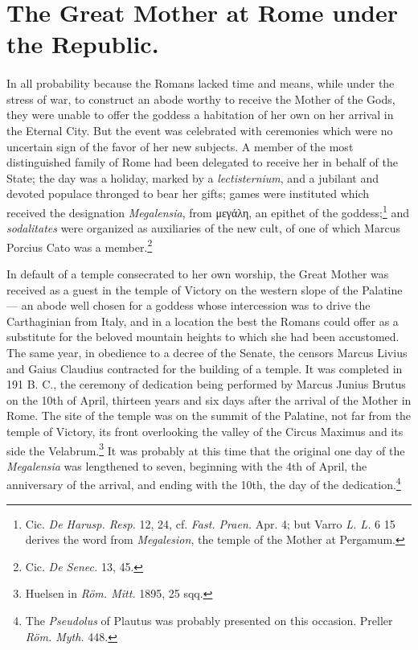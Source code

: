 \documentclass[a4paper, 11pt, oneside, polutonikogreek, english]{article}
\begin{document}
\section{The Great Mother at Rome under the Republic.}
\paragraph{}
In all probability because the Romans lacked time and means, while under the stress of war, to construct an abode worthy to receive the Mother of the Gods, they were unable to offer the goddess a habitation of her own on her arrival in the Eternal City. But the event was celebrated with ceremonies which were no uncertain sign of the favor of her new subjects. A member of the most distinguished family of Rome had been delegated to receive her in behalf of the State; the day was a holiday, marked by a \emph{lectisternium}, and a jubilant and devoted populace thronged to bear her gifts; games were instituted which received the designation \emph{Megalensia}, from μεγάλη, an epithet of the goddess;\footnote{Cic. \emph{De Harusp. Resp.} 12, 24, cf. \emph{Fast. Praen.} Apr. 4; but Varro \emph{L. L.} 6 15 derives the word from \emph{Megalesion}, the temple of the Mother at Pergamum.} and \emph{sodalitates} were organized as auxiliaries of the new cult, of one of which Marcus Porcius Cato was a member.\footnote{Cic. \emph{De Senec.} 13, 45.}

In default of a temple consecrated to her own worship, the Great Mother was received as a guest in the temple of Victory on the western slope of the Palatine --- an abode well chosen for a goddess whose intercession was to drive the Carthaginian from Italy, and in a location the best the Romans could offer as a substitute for the beloved mountain heights to which she had been accustomed. The same year, in obedience to a decree of the Senate, the censors Marcus Livius and Gaius Claudius contracted for the building of a temple. It was completed in 191 B. C., the ceremony of dedication being performed by Marcus Junius Brutus on the 10th of April, thirteen years and six days after the arrival of the Mother in Rome. The site of the temple was on the summit of the Palatine, not far from the temple of Victory, its front overlooking the valley of the Circus Maximus and its side the Velabrum.\footnote{Huelsen in \emph{Röm. Mitt.} 1895, 25 sqq.} It was probably at this time that the original one day of the \emph{Megalensia} was lengthened to seven, beginning with the 4th of April, the anniversary of the arrival, and ending with the 10th, the day of the dedication.\footnote{The \emph{Pseudolus} of Plautus was probably presented on this occasion. Preller \emph{Röm. Myth.} 448.}
\end{document}

